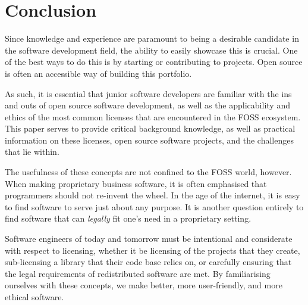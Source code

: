 \documentclass[manuscript,screen,nonacm,12pt]{acmart}
\begin{document}
% 

\section{Conclusion}
Since knowledge and experience are paramount to being a desirable candidate in
the software development field, the ability to easily showcase this is crucial.
One of the best ways to do this is by starting or contributing to projects. Open
source is often an accessible way of building this portfolio.

As such, it is essential that junior software developers are familiar with the
ins and outs of open source software development, as well as the applicability
and ethics of the most common licenses that are encountered in the FOSS
ecosystem. This paper serves to provide critical background knowledge, as well
as practical information on these licenses, open source software projects, and
the challenges that lie within.

The usefulness of these concepts are not confined to the FOSS world, however.
When making proprietary business software, it is often emphasised that
programmers should not re-invent the wheel. In the age of the internet, it is
easy to find software to serve just about any purpose. It is another question
entirely to find software that can \textit{legally} fit one's need in a
proprietary setting.

Software engineers of today and tomorrow must be intentional and considerate
with respect to licensing, whether it be licensing of the projects that they
create, sub-licensing a library that their code base relies on, or carefully
ensuring that the legal requirements of redistributed software are met. By
familiarising ourselves with these concepts, we make better, more user-friendly,
and more ethical software.

\newpage



\end{document}
